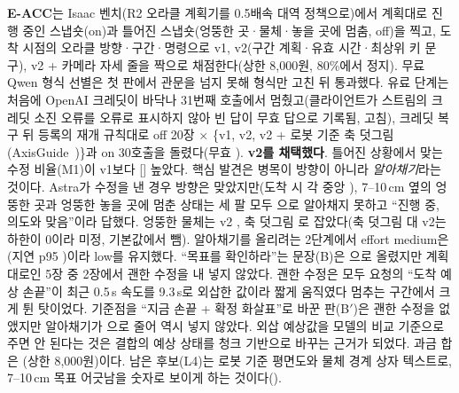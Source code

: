 \textbf{E-ACC}는 Isaac 벤치(R2 오라클 계획기를 0.5배속 대역 정책으로)에서 계획대로 진행 중인 스냅숏(on)과 틀어진 스냅숏(엉뚱한 곳·물체·놓을 곳에 멈춤, off)을 찍고, 도착 시점의 오라클 방향·구간·명령으로 v1, v2(구간 계획·유효 시간·최상위 키 문구), v2 + 카메라 자세 줄을 짝으로 채점한다(상한 8,000원, 80\%에서 정지). 무료 Qwen 형식 선별은 첫 판에서 관문을 넘지 못해 형식만 고친 뒤 통과했다. 유료 단계는 처음에 OpenAI 크레딧이 바닥나 31번째 호출에서 멈췄고(클라이언트가 스트림의 크레딧 소진 오류를 오류로 표시하지 않아 빈 답이 무효 답으로 기록됨, 고침), 크레딧 복구 뒤 등록의 재개 규칙대로 off 20장 $\times$ \{v1, v2, v2 + 로봇 기준 축 덧그림(AxisGuide~\cite{axisguide2026})\}과 on 30호출을 돌렸다(무효 ). \textbf{v2를 채택했다}. 틀어진 상황에서 맞는 수정 비율(M1)이 v1보다  [] 높았다. 핵심 발견은 병목이 방향이 아니라 \emph{알아채기}라는 것이다. Astra가 수정을 낸 경우 방향은  맞았지만(도착 시 각 중앙 ), 7--10\,cm 옆의 엉뚱한 곳과 엉뚱한 놓을 곳에 멈춘 상태는 세 팔 모두 으로 알아채지 못하고 ``진행 중, 의도와 맞음''이라 답했다. 엉뚱한 물체는 v2 , 축 덧그림 로 잡았다(축 덧그림 대 v2는 하한이 0이라 미정, 기본값에서 뺌). 알아채기를 올리려는 2단계에서 effort medium은 (지연 p95 )이라 low를 유지했다. ``목표를 확인하라''는 문장(B)은 으로 올렸지만 계획대로인 5장 중 2장에서 괜한 수정을 내 넣지 않았다. 괜한 수정은 모두 요청의 ``도착 예상 손끝''이 최근 0.5\,s 속도를 9.3\,s로 외삽한 값이라 짧게 움직였다 멈추는 구간에서 크게 튄 탓이었다. 기준점을 ``지금 손끝 + 확정 화살표''로 바꾼 판(B$'$)은 괜한 수정을 없앴지만 알아채기가 으로 줄어 역시 넣지 않았다. 외삽 예상값을 모델의 비교 기준으로 주면 안 된다는 것은 결합의 예상 상태를 청크 기반으로 바꾸는 근거가 되었다. 과금 합은 (상한 8,000원)이다. 남은 후보(L4)는 로봇 기준 평면도와 물체 경계 상자 텍스트로, 7--10\,cm 목표 어긋남을 숫자로 보이게 하는 것이다().

